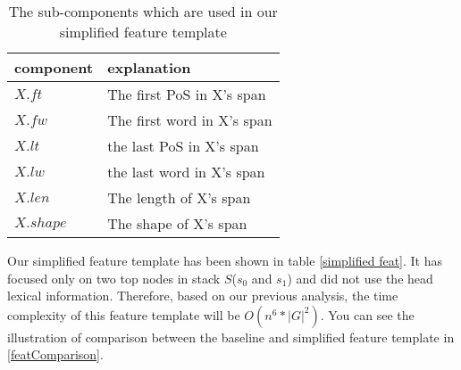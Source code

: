 \begin{table}
	\caption{\label{simplified subcomp} The sub-components which are used in our simplified feature template}
	\begin{center}
		\begin{tabular}{|l|l|}
			\hline 
			component & explanation \\ 
			\hline
			$X.ft$ &  The first PoS in X's span \\
			$X.fw$ &  The first word in X's span \\
			$X.lt$ &  the last PoS in X's span \\
			$X.lw$ &  the last word in X's span \\
			$X.len$ &  The length of X's span \\
			$X.shape$ &  The shape of X's span \\
			\hline
		\end{tabular}
	\end{center}
\end{table}

Our simplified feature template has been shown in table \ref{simplified feat}. It has focused only on two top nodes in stack $S$($s_0$ and $s_1$) and did not use the head lexical information. Therefore, based on our previous analysis, the time complexity of this feature template will be $O(n^6*|G|^2)$. You can see the illustration of comparison between the baseline and simplified feature template in \ref{featComparison}.


